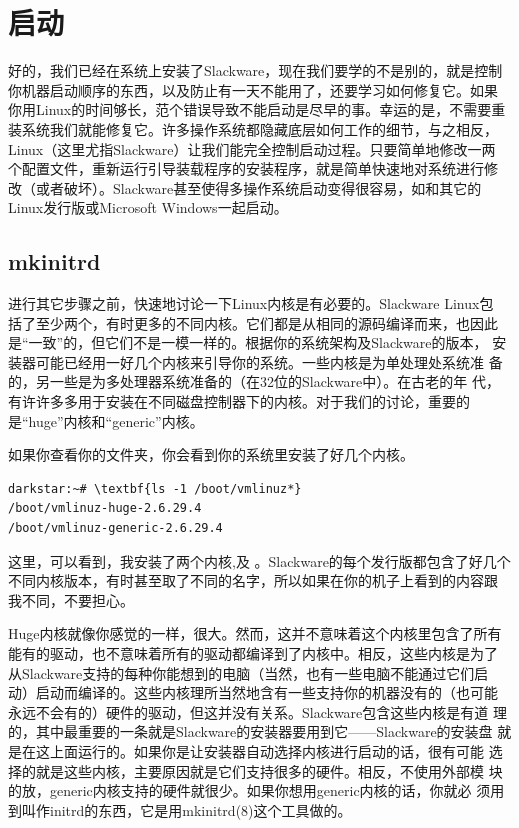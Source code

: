 
\chapter{启动}
\label{chap:booting}

好的，我们已经在系统上安装了Slackware，现在我们要学的不是别的，就是控制
你机器启动顺序的东西，以及防止有一天不能用了，还要学习如何修复它。如果
你用Linux的时间够长，范个错误导致不能启动是尽早的事。幸运的是，不需要重
装系统我们就能修复它。许多操作系统都隐藏底层如何工作的细节，与之相反，
Linux（这里尤指Slackware）让我们能完全控制启动过程。只要简单地修改一两
个配置文件，重新运行引导装载程序的安装程序，就是简单快速地对系统进行修
改（或者破坏）。Slackware甚至使得多操作系统启动变得很容易，如和其它的
Linux发行版或Microsoft Windows一起启动。

\section{mkinitrd}
\label{sec:booting:mkinitrd}

进行其它步骤之前，快速地讨论一下Linux内核是有必要的。Slackware Linux包
括了至少两个，有时更多的不同内核。它们都是从相同的源码编译而来，也因此
是``一致''的，但它们不是一模一样的。根据你的系统架构及Slackware的版本，
安装器可能已经用一好几个内核来引导你的系统。一些内核是为单处理处系统准
备的，另一些是为多处理器系统准备的（在32位的Slackware中）。在古老的年
代，有许许多多用于安装在不同磁盘控制器下的内核。对于我们的讨论，重要的
是``huge''内核和``generic''内核。

如果你查看你的文件夹，你会看到你的系统里安装了好几个内核。
\begin{Verbatim}[frame=single,commandchars=\\\{\}]
darkstar:~# \textbf{ls -1 /boot/vmlinuz*}
/boot/vmlinuz-huge-2.6.29.4
/boot/vmlinuz-generic-2.6.29.4
\end{Verbatim}
这里，可以看到，我安装了两个内核,及
。Slackware的每个发行版都包含了好几个
不同内核版本，有时甚至取了不同的名字，所以如果在你的机子上看到的内容跟
我不同，不要担心。

Huge内核就像你感觉的一样，很大。然而，这并不意味着这个内核里包含了所有
能有的驱动，也不意味着所有的驱动都编译到了内核中。相反，这些内核是为了
从Slackware支持的每种你能想到的电脑（当然，也有一些电脑不能通过它们启
动）启动而编译的。这些内核理所当然地含有一些支持你的机器没有的（也可能
永远不会有的）硬件的驱动，但这并没有关系。Slackware包含这些内核是有道
理的，其中最重要的一条就是Slackware的安装器要用到它——Slackware的安装盘
就是在这上面运行的。如果你是让安装器自动选择内核进行启动的话，很有可能
选择的就是这些内核，主要原因就是它们支持很多的硬件。相反，不使用外部模
块的放，generic内核支持的硬件就很少。如果你想用generic内核的话，你就必
须用到叫作initrd的东西，它是用mkinitrd(8)这个工具做的。

